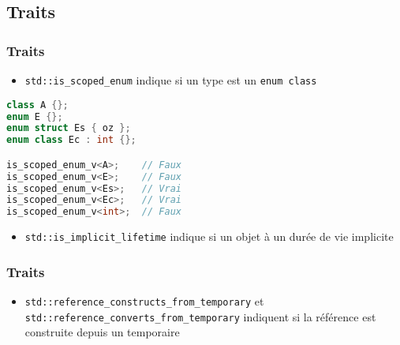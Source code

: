 \documentclass[C++.tex]{subfiles}
\begin{document}
\subsection*{Traits}
\begin{frame}[fragile]
	\frametitle{Traits}
	\begin{itemize}
		\item \lstinline|std::is_scoped_enum| indique si un type est un \lstinline|enum class|
	\end{itemize}

	\begin{lstlisting}[language=C++]
class A {};
enum E {};
enum struct Es { oz };
enum class Ec : int {};

is_scoped_enum_v<A>;	// Faux
is_scoped_enum_v<E>;	// Faux
is_scoped_enum_v<Es>;	// Vrai
is_scoped_enum_v<Ec>;	// Vrai
is_scoped_enum_v<int>;	// Faux\end{lstlisting}

	\begin{itemize}
		\item \lstinline|std::is_implicit_lifetime| indique si un objet à un durée de vie implicite
	\end{itemize}
\end{frame}

\begin{frame}[fragile]
	\frametitle{Traits}
	\begin{itemize}
		\item \lstinline|std::reference_constructs_from_temporary| et \lstinline|std::reference_converts_from_temporary| indiquent si la référence est construite depuis un temporaire
	\end{itemize}
\end{frame}
\end{document}
